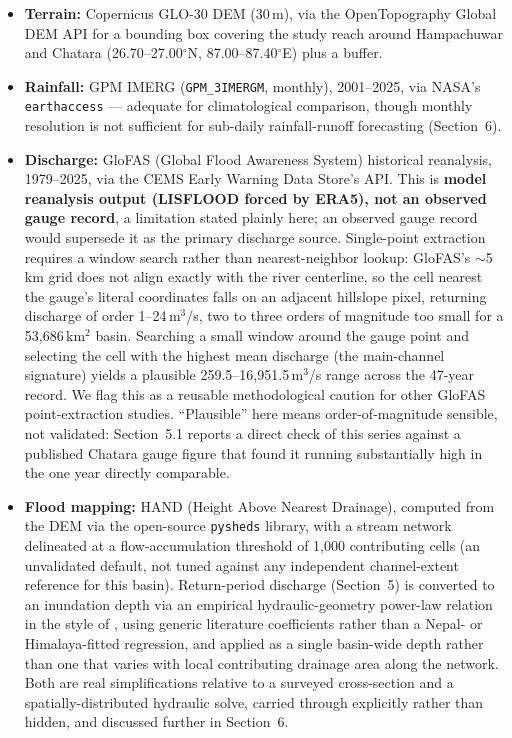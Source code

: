 \documentclass[11pt]{article}
\begin{document}
\begin{itemize}
\item \textbf{Terrain:} Copernicus GLO-30 DEM (30\,m), via the OpenTopography Global DEM API for a bounding box covering the study reach around Hampachuwar and Chatara (26.70--27.00$^\circ$N, 87.00--87.40$^\circ$E) plus a buffer.
\item \textbf{Rainfall:} GPM IMERG (\texttt{GPM\_3IMERGM}, monthly), 2001--2025, via NASA's \texttt{earthaccess} --- adequate for climatological comparison, though monthly resolution is not sufficient for sub-daily rainfall-runoff forecasting (Section~6).
\item \textbf{Discharge:} GloFAS (Global Flood Awareness System) historical reanalysis, 1979--2025, via the CEMS Early Warning Data Store's API. This is \textbf{model reanalysis output (LISFLOOD forced by ERA5), not an observed gauge record}, a limitation stated plainly here; an observed gauge record would supersede it as the primary discharge source. Single-point extraction requires a window search rather than nearest-neighbor lookup: GloFAS's ${\sim}$5\,km grid does not align exactly with the river centerline, so the cell nearest the gauge's literal coordinates falls on an adjacent hillslope pixel, returning discharge of order 1--24\,m$^3$/s, two to three orders of magnitude too small for a 53,686\,km$^2$ basin. Searching a small window around the gauge point and selecting the cell with the highest mean discharge (the main-channel signature) yields a plausible 259.5--16,951.5\,m$^3$/s range across the 47-year record. We flag this as a reusable methodological caution for other GloFAS point-extraction studies. ``Plausible'' here means order-of-magnitude sensible, not validated: Section~5.1 reports a direct check of this series against a published Chatara gauge figure that found it running substantially high in the one year directly comparable.
\item \textbf{Flood mapping:} HAND (Height Above Nearest Drainage), computed from the DEM via the open-source \texttt{pysheds} library, with a stream network delineated at a flow-accumulation threshold of 1,000 contributing cells (an unvalidated default, not tuned against any independent channel-extent reference for this basin). Return-period discharge (Section~5) is converted to an inundation depth via an empirical hydraulic-geometry power-law relation in the style of \citet{leopoldmaddock1953}, using generic literature coefficients rather than a Nepal- or Himalaya-fitted regression, and applied as a single basin-wide depth rather than one that varies with local contributing drainage area along the network. Both are real simplifications relative to a surveyed cross-section and a spatially-distributed hydraulic solve, carried through explicitly rather than hidden, and discussed further in Section~6.

\end{itemize}
\end{document}
